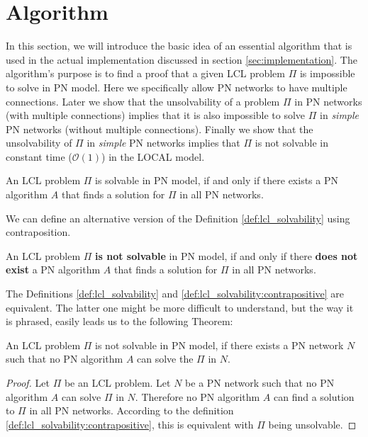
\section{Algorithm} \label{sec:algorithm}

In this section, we will introduce the basic idea of an essential algorithm that is used in the actual implementation discussed in section \ref{sec:implementation}.
The algorithm's purpose is to find a proof that a given LCL problem $\Pi$ is impossible to solve in PN model.
Here we specifically allow PN networks to have multiple connections.
Later we show that the unsolvability of a problem $\Pi$ in PN networks (with multiple connections) implies that it is also impossible to solve $\Pi$ in \emph{simple} PN networks (without multiple connections).
Finally we show that the unsolvability of $\Pi$ in \emph{simple} PN networks implies that $\Pi$ is not solvable in constant time ($\mathcal{O}(1)$) in the LOCAL model.

\begin{definition} \label{def:lcl_solvability}
    An LCL problem $\Pi$ is solvable in PN model, if and only if there exists a PN algorithm $A$ that finds a solution for $\Pi$ in all PN networks.
\end{definition}

We can define an alternative version of the Definition \ref{def:lcl_solvability} using contraposition.
\begin{definition} \label{def:lcl_solvability:contrapositive}
An LCL problem $\Pi$ \textbf{is not solvable} in PN model, if and only if there \textbf{does not exist} a PN algorithm $A$ that finds a solution for $\Pi$ in all PN networks.
\end{definition}

The Definitions \ref{def:lcl_solvability} and \ref{def:lcl_solvability:contrapositive} are equivalent. The latter one might be more difficult to understand, but the way it is phrased, easily leads us to the following Theorem:

\begin{theorem} \label{thm:lcl_nonsolvability}
    An LCL problem $\Pi$ is not solvable in PN model, if there exists a PN network $N$ such that no PN algorithm $A$ can solve the $\Pi$ in $N$.
\end{theorem}
\begin{proof}
    Let $\Pi$ be an LCL problem.
    Let $N$ be a PN network such that no PN algorithm $A$ can solve $\Pi$ in $N$.
    Therefore no PN algorithm $A$ can find a solution to $\Pi$ in all PN networks.
    According to the definition \ref{def:lcl_solvability:contrapositive}, this is equivalent with $\Pi$ being unsolvable.
\end{proof}

